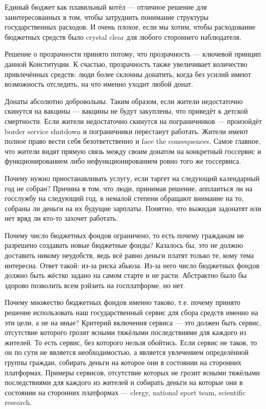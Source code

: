 \documentclass[11pt]{article}
\theoremstyle{remark}
\theoremstyle{definition}
\begin{document}
\color{blue}

Единый бюджет как плавильный котёл --- отличное решение для заинтересованных в том, чтобы затруднить понимание структуры государственных расходов. И очень плохое, если мы хотим, чтобы расходование бюджетных средств было crystal clear для любого стороннего наблюдателя.


Решение о прозрачности принято потому, что прозрачность --- ключевой принцип данной Конституции. К счастью, прозрачность также увеличивает количество привлечённых средств: люди более склонны донатить, когда без усилий имеют возможность отследить, на что именно уходит любой донат. 


Донаты абсолютно добровольны. Таким образом, если жители недостаточно скинутся на вакцины --- вакцины не будут закуплены, что приведёт к детской смертности. Если жители недостаточно скинутся на пограничников --- произойдёт border service shutdown и пограничники перестанут работать. Жители имеют полное право вести себя безответственно и face the consequences. Самое главное, что жители видят прямую связь между своим донатом на конкретный госсервис и функционированием либо нефункционированием ровно того же госсервиса. 

Почему нужно приостанавливать услугу, если таргет на следующий календарный год не собран? Причина в том, что люди, принимая решение, апплаиться ли на госслужбу на следующий год, в немалой степени обращают внимание на то, собраны ли деньги на их будущие зарплаты. Понятно, что выжидая задонатят или нет вряд ли кто-то захочет работать.



Почему число бюджетных фондов ограничено, то есть почему гражданам не разрешено создавать новые бюджетные фонды? Казалось бы, это не должно доставить никому неудобств, ведь всё равно деньги платят только те, кому тема интересна. Ответ такой: из-за риска абьюза. Из-за него число бюджетных фондов должно быть жёстко задано на самом старте и не расти. Абстрактно было бы здорово позволить всем рэйзить на госплатформе, но нет.


Почему множество бюджетных фондов именно таково, т.е. почему принято решение использовать наш государственный сервис для сбора средств именно на эти цели, а не на иные? Критерий включения сервиса --- это должен быть сервис, отсутствие которого грозит ясными тяжёлыми последствиями для каждого из жителей. То есть сервис, без которого нельзя обойтись. Если сервис не таков, то он по сути не является необходимостью, а является увлечением определённой группы граждан, собирать деньги на которое они в состоянии на сторонних платформах. Примеры сервисов, отсутствие которых не грозит ясными тяжёлыми последствиями для каждого из жителей и собирать деньги на которые они в состоянии на сторонних платформах --- clergy, national sport team, scientific research.
\end{document}

